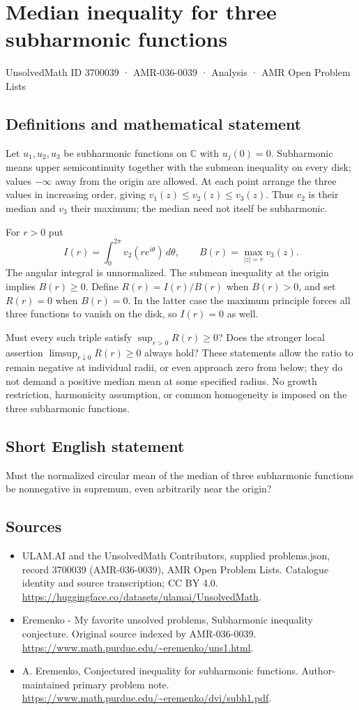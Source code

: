 \documentclass[11pt,a4paper]{article}
\begin{document}
\section*{Median inequality for three subharmonic functions}\label{3700039}
{\small UnsolvedMath ID 3700039 · AMR-036-0039 · Analysis · AMR Open Problem Lists}
\subsection{Definitions and mathematical statement}
Let $u_1,u_2,u_3$ be subharmonic functions on
$\mathbb C$ with $u_j(0)=0$. Subharmonic means
upper semicontinuity together with the submean inequality
on every disk; values $-\infty$ away from the origin
are allowed. At each point arrange the three values
in increasing order, giving
$v_1(z)\leq v_2(z)\leq v_3(z)$.
Thus $v_2$ is their median and $v_3$ their maximum;
the median need not itself be subharmonic.

For $r>0$ put
\[
 I(r)=\int_0^{2\pi}v_2(re^{i\theta})\,d\theta,\qquad
 B(r)=\max_{|z|=r}v_3(z).
\]
The angular integral is unnormalized. The submean
inequality at the origin implies $B(r)\geq0$.
Define $R(r)=I(r)/B(r)$ when $B(r)>0$,
and set $R(r)=0$ when $B(r)=0$.
In the latter case the maximum principle forces
all three functions to vanish on the disk,
so $I(r)=0$ as well.

Must every such triple satisfy
$\sup_{r>0}R(r)\geq0$?
Does the stronger local assertion
$\limsup_{r\downarrow0}R(r)\geq0$ always hold?
These statements allow the ratio to remain
negative at individual radii, or even approach
zero from below; they do not demand a positive
median mean at some specified radius.
No growth restriction, harmonicity assumption,
or common homogeneity is imposed on the three
subharmonic functions.
\subsection{Short English statement}
Must the normalized circular mean of the median of three subharmonic functions be nonnegative in supremum, even arbitrarily near the origin?
\subsection{Sources}
\begin{itemize}
\item[S1] ULAM.AI and the UnsolvedMath Contributors, supplied problems.json, record 3700039 (AMR-036-0039), AMR Open Problem Lists. Catalogue identity and source transcription; CC BY 4.0.
\url{https://huggingface.co/datasets/ulamai/UnsolvedMath}.
\item[S2] Eremenko - My favorite unsolved problems, Subharmonic inequality conjecture. Original source indexed by AMR-036-0039.
\url{https://www.math.purdue.edu/~eremenko/uns1.html}.
\item[S3] A. Eremenko, Conjectured inequality for subharmonic functions. Author-maintained primary problem note.
\url{https://www.math.purdue.edu/~eremenko/dvi/subh1.pdf}.
\end{itemize}
\end{document}
